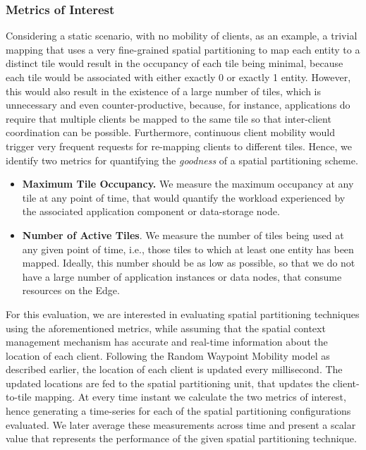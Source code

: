 \subsubsection{Metrics of Interest}
Considering a static scenario, with no mobility of clients, as an example, a trivial mapping that uses a very fine-grained spatial partitioning to map each entity to a distinct tile would result in the occupancy of each tile being minimal, because each tile would be associated with either exactly 0 or exactly 1 entity. However, this would also result in the existence of a large number of tiles, which is unnecessary and even counter-productive, because, for instance, applications do require that multiple clients be mapped to the same tile so that inter-client coordination can be possible. Furthermore, continuous client mobility would trigger very frequent requests for re-mapping clients to different tiles. Hence, we identify two metrics for quantifying the \textit{goodness} of a spatial partitioning scheme. 
\begin{itemize}
\item \textbf{Maximum Tile Occupancy.} We measure the maximum occupancy at any tile at any point of time, that would quantify the workload experienced by the associated application component or data-storage node. 
\item \textbf{Number of Active Tiles}. We measure the number of tiles being used at any given point of time, i.e., those tiles to which at least one entity has been mapped. Ideally, this number should be as low as possible, so that we do not have a large number of application instances or data nodes, that consume resources on the Edge.
\end{itemize}
\par For this evaluation, we are interested in evaluating spatial partitioning techniques using the aforementioned metrics, while assuming that the spatial context management mechanism has accurate and real-time information about the location of each client. Following the Random Waypoint Mobility model as described earlier, the location of each client is updated every millisecond. The updated locations are fed to the spatial partitioning unit, that updates the client-to-tile mapping. At every time instant we calculate the two metrics of interest, hence generating a time-series for each of the spatial partitioning configurations evaluated. We later average these measurements across time and present a scalar value that represents the performance of the given spatial partitioning technique.

